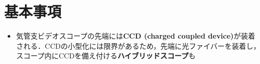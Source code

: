 
\section{基本事項}
\begin{itemize}
\item 気管支ビデオスコープの先端には\textbf{CCD (charged coupled device)}が装着される．CCDの小型化には限界があるため，先端に光ファイバーを装着し，スコープ内にCCDを備え付ける\textbf{ハイブリッドスコープ}も

\end{itemize}